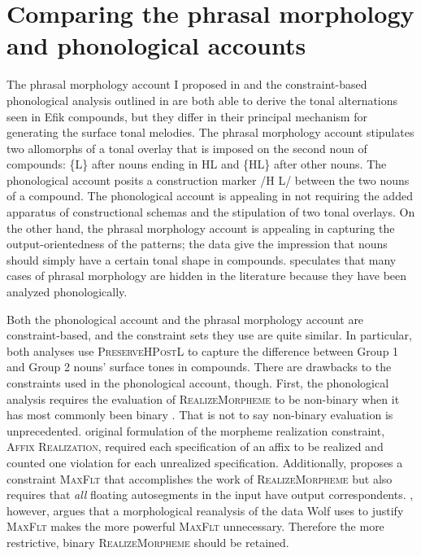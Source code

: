 \documentclass[output=paper]{langscibook}
\begin{document}
\section{Comparing the phrasal morphology and phonological accounts}\label{sec:glewwe:4}
The phrasal morphology account I proposed in  and the constraint-based phonological analysis outlined in  are both able to derive the tonal alternations seen in Efik compounds, but they differ in their principal mechanism for generating the surface tonal melodies. The phrasal morphology account stipulates two allomorphs of a tonal overlay that is imposed on the second noun of compounds: \{L\} after nouns ending in HL and \{HL\} after other nouns. The phonological account posits a construction marker /H L/ between the two nouns of a compound. The phonological account is appealing in not requiring the added apparatus of constructional schemas and the stipulation of two tonal overlays. On the other hand, the phrasal morphology account is appealing in capturing the output-orientedness of the patterns; the data give the impression that nouns should simply have a certain tonal shape in compounds. \citet{McPherson2014} speculates that many cases of phrasal morphology are hidden in the literature because they have been analyzed phonologically. 

Both the phonological account and the phrasal morphology account are con\-straint-based, and the constraint sets they use are quite similar. In particular, both analyses use \textsc{PreserveHPostL} to capture the difference between Group 1 and Group 2 nouns’ surface tones in compounds. There are drawbacks to the constraints used in the phonological account, though. First, the phonological analysis requires the evaluation of \textsc{RealizeMorpheme} to be non-binary when it has most commonly been binary \citep{Gnanadesikan1997,Kurisu2001,Oostendorp2005,Wolf2007}. That is not to say non-binary evaluation is unprecedented.  original formulation of the morpheme realization constraint, \textsc{Affix} \textsc{Realization}, required each specification of an affix to be realized and counted one violation for each unrealized specification. Additionally, \citet{Wolf2007} proposes a constraint \textsc{MaxFlt} that accomplishes the work of \textsc{RealizeMorpheme} but also requires that \textit{all} floating autosegments in the input have output correspondents. \citet{Trommer2012}, however, argues that a morphological reanalysis of the data Wolf uses to justify \textsc{MaxFlt} makes the more powerful \textsc{MaxFlt} unnecessary. Therefore the more restrictive, binary \textsc{RealizeMorpheme} should be retained. 
\end{document}
